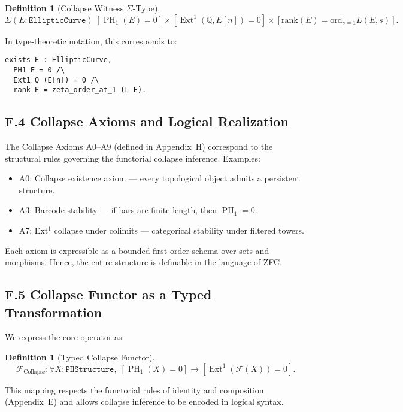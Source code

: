 \documentclass[11pt]{article}
\newtheorem{definition}[theorem]{Definition}
\DeclareMathOperator{\Ext}{Ext}
\DeclareMathOperator{\PH}{PH}
\newcommand{\QQ}{\mathbb{Q}}
\begin{document}
\begin{definition}[Collapse Witness $\Sigma$-Type]
\[
\Sigma (E : \texttt{EllipticCurve})\;
[\PH_1(E) = 0] \times [\Ext^1(\QQ,E[n]) = 0] \times 
[\mathrm{rank}(E) = \mathrm{ord}_{s=1} L(E,s)].
\]
\end{definition}

In type-theoretic notation, this corresponds to:

\begin{lstlisting}[language=Coq]
exists E : EllipticCurve,
  PH1 E = 0 /\
  Ext1 Q (E[n]) = 0 /\
  rank E = zeta_order_at_1 (L E).
\end{lstlisting}

\subsection*{F.4 Collapse Axioms and Logical Realization}

The Collapse Axioms A0--A9 (defined in Appendix~H) correspond to the structural rules governing the functorial collapse inference.  
Examples:

\begin{itemize}
  \item A0: Collapse existence axiom --- every topological object admits a persistent structure.
  \item A3: Barcode stability --- if bars are finite-length, then $\PH_1 = 0$.
  \item A7: Ext$^1$ collapse under colimits --- categorical stability under filtered towers.
\end{itemize}

Each axiom is expressible as a bounded first-order schema over sets and morphisms.  
Hence, the entire structure is definable in the language of ZFC.

\subsection*{F.5 Collapse Functor as a Typed Transformation}

We express the core operator as:

\begin{definition}[Typed Collapse Functor]
\[
\mathcal{F}_{\mathrm{Collapse}} :
\forall X : \texttt{PHStructure},\;
[\PH_1(X) = 0] \to [\Ext^1(\mathcal{F}(X)) = 0].
\]
\end{definition}

This mapping respects the functorial rules of identity and composition (Appendix~E) and allows collapse inference to be encoded in logical syntax.
\end{document}
